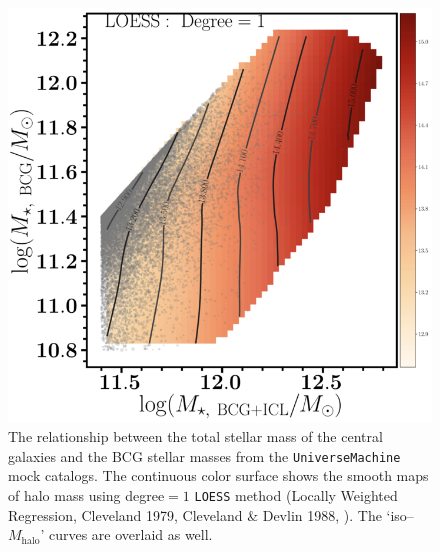 \documentclass[a4paper,fleqn,usenatbib]{mnras}
\def\mhalo{{$M_{\mathrm{halo}}$}}
\def\um{\texttt{UniverseMachine}}
\begin{document}
    \begin{figure}
        \centering 
        \includegraphics[width=\columnwidth]{fig/um2_tot_bch_halo}
            \caption{
                The relationship between the total stellar mass of the central galaxies 
                and the BCG stellar masses from the \um{} mock catalogs.  
                The continuous color surface shows the smooth maps of halo mass using 
                degree$=1$ \texttt{LOESS} method (Locally Weighted Regression, 
                Cleveland 1979, Cleveland \& Devlin 1988, \citealt{Cappellari2013b}).  
                The `iso--\mhalo{}' curves are overlaid as well.
                }
        \label{fig:um2_m100_m10_1}
    \end{figure}
\end{document}
